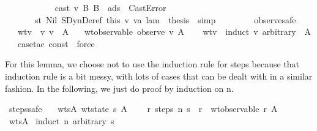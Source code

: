\begin{isabellebody}
\ \ \ \ \isamarkupfalse \isanewline
\ \ \ \ \ \ \isamarkupfalse \ {\isachardoublequoteopen}cast\ v{}\ B{\isacharprime}\ B\ {\isasymmu}\ ads\ {\isacharequal}\ CastError{\isachardoublequoteclose}\isanewline
\ \ \ \ \ \ \isamarkupfalse \ st\ Nil\ SDynDeref\ this\ v\ va\ lam\ \isamarkupfalse \ {\isacharquery}thesis\ \isamarkupfalse \ simp\isanewline
\ \ \ \ \isamarkupfalse \isanewline
\ \ \isamarkupfalse \isanewline
{}\isamarkupfalse \isanewline
{}\isamarkupfalse \endisatagproof
{\isafoldproof}\isadelimproof
\isanewline
\endisadelimproof
\isanewline
{}\isamarkupfalse \ observe{\isacharunderscore}safe{\isacharcolon}\isanewline
\ \ \ wtv{\isacharcolon}\ {\isachardoublequoteopen}{\isasymSigma}\ {\isasymturnstile}v\ v\ {\isacharcolon}\ A{\isachardoublequoteclose}\isanewline
\ \ \ {\isachardoublequoteopen}wt{\isacharunderscore}observable\ {\isacharparenleft}observe\ v{\isacharparenright}\ A{\isachardoublequoteclose}\isanewline
\isadelimproof
\ \ \endisadelimproof
\isatagproof
{}\isamarkupfalse \ wtv\ \isamarkupfalse \ {\isacharparenleft}induct\ v\ arbitrary{\isacharcolon}\ {\isasymSigma}\ A{\isacharparenright}\isanewline
\ \ \isamarkupfalse \ {\isacharparenleft}case{\isacharunderscore}tac\ const{\isacharparenright}\ \isamarkupfalse \ force{\isacharplus}\ \isamarkupfalse \endisatagproof
{\isafoldproof}\isadelimproof
\endisadelimproof
\begin{isamarkuptext}For this lemma, we choose not to use the induction rule for steps
  because that induction rule is a bit messy, with lots of cases
  that can be dealt with in a similar fashion. In the following,
  we just do proof by induction on n.\end{isamarkuptext}\isamarkuptrue {}\isamarkupfalse \ steps{\isacharunderscore}safe{\isacharcolon}\isanewline
\ \ \ wtsA{\isacharcolon}\ {\isachardoublequoteopen}wt{\isacharunderscore}state\ s\ A{\isachardoublequoteclose}\isanewline
\ \ \ {\isachardoublequoteopen}{\isasymexists}\ r{\isachardot}\ steps\ n\ s\ {\isacharequal}\ r\ {\isasymand}\ wt{\isacharunderscore}observable\ r\ A{\isachardoublequoteclose}\isanewline
\isadelimproof
\ \ \endisadelimproof
\isatagproof
{}\isamarkupfalse \ wtsA\isanewline
{}\isamarkupfalse \ {\isacharparenleft}induct\ n\ arbitrary{\isacharcolon}\ s{\isacharparenright}\isanewline

\end{isabellebody}
